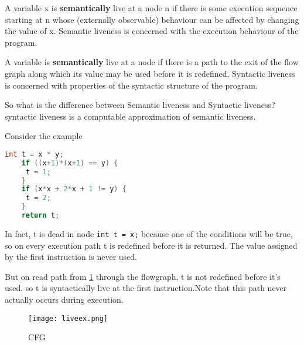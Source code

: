 A variable x is \textbf{semantically} live at a node n if there is
some execution sequence starting at n whose (externally
observable) behaviour can be affected by changing the
value of x. Semantic liveness is concerned with
the execution behaviour of the program.

A variable is \textbf{semantically} live at a node if there is a
path to the exit of the flow graph along which its
value may be used before it is redefined. Syntactic liveness is concerned with properties of
the syntactic structure of the program.


So what is the difference between Semantic liveness and Syntactic liveness? syntactic liveness
is a computable approximation of semantic liveness.


Consider the example 


\begin{lstlisting}[language=C,frame=single, caption=An ,label = lst:expr2]
    int t = x * y;
    if ((x+1)*(x+1) == y) {
     t = 1;
    }
    if (x*x + 2*x + 1 != y) {
     t = 2;
    }
    return t;
\end{lstlisting}

In fact, t is dead in node \texttt{int t = x;} because one of the conditions will be true, 
so on every execution path t is redefined before it is returned.
The value assigned by the first instruction is never used.


But on read path from \ref{fig:liveex} through the
flowgraph, t is not
redefined before it's used,
so t is syntactically live at
the first instruction.Note that this path never
actually occurs during
execution.

\begin{figure}[h]
    \centering
    \texttt{[image: liveex.png]}
    \caption{CFG}
    \label{fig:liveex}
\end{figure}





